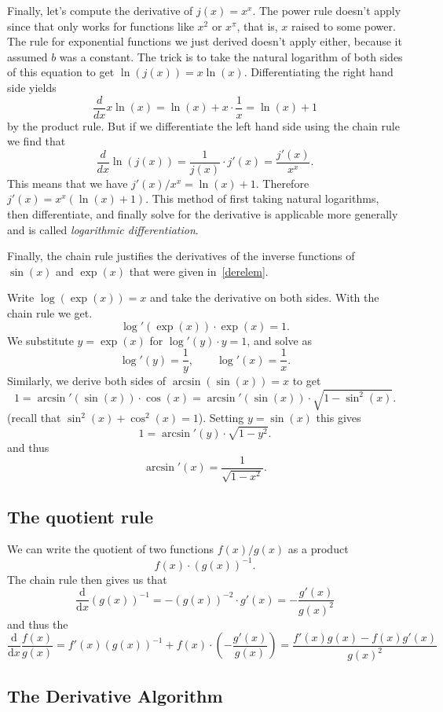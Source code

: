 \begin{bsp}
Finally, let's compute the derivative of $j(x) = x^x$. The power rule doesn't
apply since that only works for functions like $x^2$ or $x^\pi$, that is, $x$
raised to some power. The rule for exponential functions we just derived
doesn't apply either, because it assumed $b$ was a constant. The trick is to
take the natural logarithm of both sides of this equation to get $\ln(j(x)) =
x\ln(x)$. Differentiating the right hand side yields
\[
\frac{d}{dx}x\ln(x) = \ln(x) + x\cdot\frac{1}{x} = \ln(x)+1
\]
by the product rule. But if we differentiate the left hand side using the
chain rule we find that
\[
\frac{d}{dx}\ln(j(x)) = \frac{1}{j(x)} \cdot j'(x) = \frac{j'(x)}{x^x}.
\]
This means that we have $j'(x)/x^x = \ln(x)+1$. Therefore $j'(x) =
x^x(\ln(x)+1)$.
This method of first taking natural logarithms, then differentiate, and
finally solve for the derivative is applicable more generally and is called
\textit{logarithmic differentiation}.
\end{bsp}
\medskip

Finally, the chain rule justifies the derivatives of the inverse functions
of $\sin(x)$ and $\exp(x)$ that were given in~\ref{derelem}.

Write
$\log(\exp(x))=x$ and take the derivative on both sides. With the chain rule
we get.
\[
\log'(\exp(x))\cdot\exp(x)=1.
\]
We substitute $y=\exp(x)$ for $\log'(y)\cdot y=1$, and solve as
\[
\log'(y)=\frac{1}{y}, \qquad \log'(x)=\frac{1}{x}.
\]
Similarly, we derive both sides of $\arcsin(\sin(x))=x$ to get
\[
1=\arcsin'(\sin(x))\cdot\cos(x)=\arcsin'(\sin(x))\cdot\sqrt{1-\sin^2(x)}.
\]
(recall that $\sin^2(x)+\cos^2(x)=1$).
Setting $y=\sin(x)$ this gives
\[
1=\arcsin'(y)\cdot\sqrt{1-y^2}.
\]
and thus
\[
\arcsin'(x)=\frac{1}{\sqrt{1-x^2}}.
\]


\subsection{The quotient rule}

We can write the quotient of two functions $f(x)/g(x)$ as a product
\[
f(x)\cdot (g(x))^{-1}.
\]
The chain rule then gives us that
\[
\frac{\mbox{d}}{\mbox{d}x}\left(g(x)\right)^{-1}
=-\left(g(x)\right)^{-2}\cdot g'(x)=-\frac{g'(x)}{g(x)^2}
\]
and thus the 
\[
\frac{\mbox{d}}{\mbox{d}x}\frac{f(x)}{g(x)}=f'(x)(g(x))^{-1}+f(x)\cdot\left(-\frac{g'(x)}{g(x)}\right)
=\frac{f'(x)g(x)-f(x)g'(x)}{g(x)^2}
\]


\subsection{The Derivative Algorithm}

